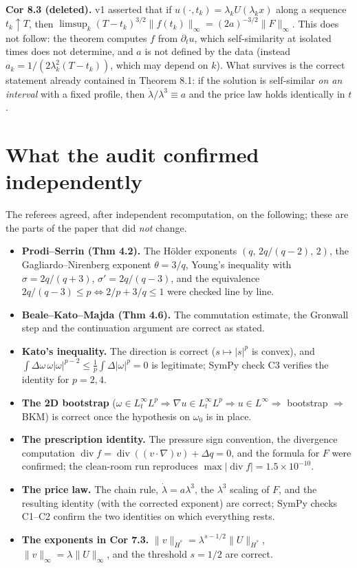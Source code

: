 \documentclass[11pt,a4paper]{article}
\begin{document}
\textbf{Cor 8.3 (deleted).} v1 asserted that if $u(\cdot,t_k)=\lambda_kU(\lambda_kx)$ along a
sequence $t_k\uparrow T$, then
$\limsup_k(T-t_k)^{3/2}\|f(t_k)\|_\infty=(2a)^{-3/2}\|F\|_\infty$. This does not follow: the
theorem computes $f$ from $\partial_tu$, which self-similarity at isolated times does not
determine, and $a$ is not defined by the data (instead
$a_k=1/(2\lambda_k^2(T-t_k))$, which may depend on $k$). What survives is the correct statement
already contained in Theorem 8.1: if the solution is self-similar \emph{on an interval} with a
fixed profile, then $\dot\lambda/\lambda^3\equiv a$ and the price law holds identically in $t$.

\section{What the audit confirmed independently}

The referees agreed, after independent recomputation, on the following; these are the parts of
the paper that did \emph{not} change.

\begin{itemize}[leftmargin=1.6em]
\item \textbf{Prodi--Serrin (Thm 4.2).} The Hölder exponents $(q,\,2q/(q-2),\,2)$, the
Gagliardo--Nirenberg exponent $\theta=3/q$, Young's inequality with $\sigma=2q/(q+3)$,
$\sigma'=2q/(q-3)$, and the equivalence $2q/(q-3)\le p\iff 2/p+3/q\le1$ were checked line by
line.
\item \textbf{Beale--Kato--Majda (Thm 4.6).} The commutation estimate, the Gronwall step and the
continuation argument are correct as stated.
\item \textbf{Kato's inequality.} The direction is correct ($s\mapsto|s|^p$ is convex), and
$\int\Delta\omega\,\omega|\omega|^{p-2}\le\frac1p\int\Delta|\omega|^p=0$ is legitimate; SymPy
check C3 verifies the identity for $p=2,4$.
\item \textbf{The 2D bootstrap} ($\omega\in L^\infty_tL^p\Rightarrow\nabla u\in L^\infty_tL^p
\Rightarrow u\in L^\infty\Rightarrow$ bootstrap $\Rightarrow$ BKM) is correct once the
hypothesis on $\omega_0$ is in place.
\item \textbf{The prescription identity.} The pressure sign convention, the divergence
computation $\operatorname{div}f=\operatorname{div}((v\cdot\nabla)v)+\Delta q=0$, and the
formula for $F$ were confirmed; the clean-room run reproduces
$\max|\operatorname{div}f|=1.5\times10^{-10}$.
\item \textbf{The price law.} The chain rule, $\dot\lambda=a\lambda^3$, the $\lambda^3$ scaling
of $F$, and the resulting identity (with the corrected exponent) are correct; SymPy checks
C1--C2 confirm the two identities on which everything rests.
\item \textbf{The exponents in Cor 7.3.} $\|v\|_{\dot H^s}=\lambda^{s-1/2}\|U\|_{\dot H^s}$,
$\|v\|_\infty=\lambda\|U\|_\infty$, and the threshold $s=1/2$ are correct.
\end{itemize}
\end{document}
